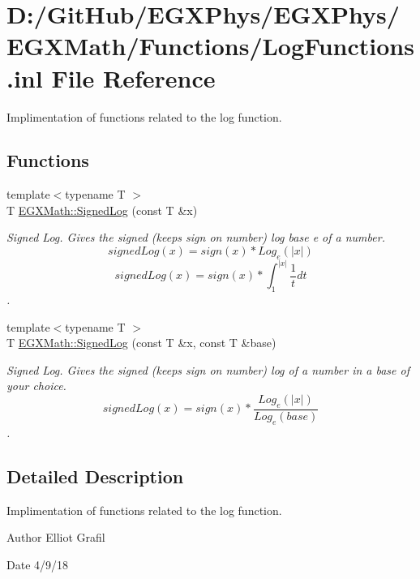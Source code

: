 \hypertarget{_log_functions_8inl}{}\section{D\+:/\+Git\+Hub/\+E\+G\+X\+Phys/\+E\+G\+X\+Phys/\+E\+G\+X\+Math/\+Functions/\+Log\+Functions.inl File Reference}
\label{_log_functions_8inl}


Implimentation of functions related to the log function.  


\subsection*{Functions}
\begin{DoxyCompactItemize}
\item 
{\footnotesize template$<$typename T $>$ }\\T \mbox{\hyperlink{group___e_g_x_math-_functions-_log_gac87b6832572195929967808d98d502d5}{E\+G\+X\+Math\+::\+Signed\+Log}} (const T \&x)
\begin{DoxyCompactList}\small\item\em Signed Log. Gives the signed (keeps sign on number) log base e of a number. \[signedLog(x)= sign(x)*Log_e(|x|)\] \[signedLog(x)= sign(x)*\int_{1}^{|x|}\frac{1}{t} dt\]. \end{DoxyCompactList}\item 
{\footnotesize template$<$typename T $>$ }\\T \mbox{\hyperlink{group___e_g_x_math-_functions-_log_ga4cd6a087fb1977d52a321bfad0dae0f6}{E\+G\+X\+Math\+::\+Signed\+Log}} (const T \&x, const T \&base)
\begin{DoxyCompactList}\small\item\em Signed Log. Gives the signed (keeps sign on number) log of a number in a base of your choice. \[signedLog(x)= sign(x)*\frac{Log_e(|x|)}{Log_e(base)}\]. \end{DoxyCompactList}\end{DoxyCompactItemize}


\subsection{Detailed Description}
Implimentation of functions related to the log function. 

\begin{DoxyAuthor}{Author}
Elliot Grafil 
\end{DoxyAuthor}
\begin{DoxyDate}{Date}
4/9/18 
\end{DoxyDate}
